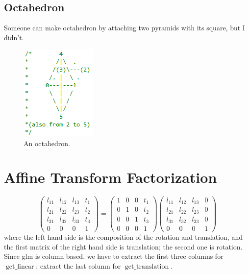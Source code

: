 \documentclass[11pt]{article}
\begin{document}
\subsection{Octahedron} \label{ssec:1.3}
Someone can make octahedron by attaching two pyramids with its square, but I didn't.
\begin{figure}[htb]
	\begin{center}
		\includegraphics[width=0.2\linewidth]{octa.png}
	\end{center}
	\caption{An octahedron.}
\end{figure}

\section{Affine Transform Factorization} \label{sec:2}
\[
\left(\begin{matrix}
	l_{11} & l_{12} & l_{13} & t_1 \\
	l_{21} & l_{22} & l_{23} & t_2 \\
	l_{31} & l_{32} & l_{33} & t_3 \\
	0 & 0 & 0 & 1
\end{matrix} \right) = \left( \begin{matrix}
1 & 0 & 0 & t_1 \\
0 & 1 & 0 & t_2 \\
0 & 0 & 1 & t_3 \\
0 & 0 & 0 & 1
\end{matrix} \right) \left( \begin{matrix}
l_{11} & l_{12} & l_{13} & 0 \\
l_{21} & l_{22} & l_{23} & 0 \\
l_{31} & l_{32} & l_{33} & 0 \\
0 & 0 & 0 & 1
\end{matrix} \right)
\]
where the left hand side is the composition of the rotation and translation, and the first matrix of the right hand side is translation; the second one is rotation. \\
Since glm is column based, we have to extract the first three columns for $\operatorname{get\_linear}$; extract the last column for $\operatorname{get\_translation}$.
\end{document}
